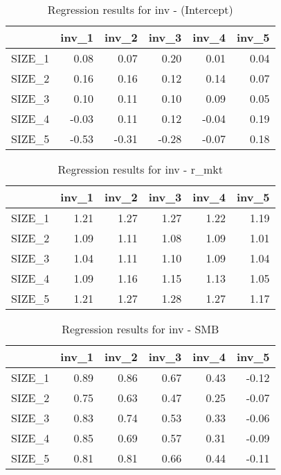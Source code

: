 \begin{table}[ht]
\centering
\caption{Regression results for inv - (Intercept)} 
\begin{tabular}{rrrrrr}
  \hline
 & inv\_1 & inv\_2 & inv\_3 & inv\_4 & inv\_5 \\ 
  \hline
SIZE\_1 & 0.08 & 0.07 & 0.20 & 0.01 & 0.04 \\ 
  SIZE\_2 & 0.16 & 0.16 & 0.12 & 0.14 & 0.07 \\ 
  SIZE\_3 & 0.10 & 0.11 & 0.10 & 0.09 & 0.05 \\ 
  SIZE\_4 & -0.03 & 0.11 & 0.12 & -0.04 & 0.19 \\ 
  SIZE\_5 & -0.53 & -0.31 & -0.28 & -0.07 & 0.18 \\ 
   \hline
\end{tabular}
\end{table}


\begin{table}[ht]
\centering
\caption{Regression results for inv - r_mkt} 
\begin{tabular}{rrrrrr}
  \hline
 & inv\_1 & inv\_2 & inv\_3 & inv\_4 & inv\_5 \\ 
  \hline
SIZE\_1 & 1.21 & 1.27 & 1.27 & 1.22 & 1.19 \\ 
  SIZE\_2 & 1.09 & 1.11 & 1.08 & 1.09 & 1.01 \\ 
  SIZE\_3 & 1.04 & 1.11 & 1.10 & 1.09 & 1.04 \\ 
  SIZE\_4 & 1.09 & 1.16 & 1.15 & 1.13 & 1.05 \\ 
  SIZE\_5 & 1.21 & 1.27 & 1.28 & 1.27 & 1.17 \\ 
   \hline
\end{tabular}
\end{table}


\begin{table}[ht]
\centering
\caption{Regression results for inv - SMB} 
\begin{tabular}{rrrrrr}
  \hline
 & inv\_1 & inv\_2 & inv\_3 & inv\_4 & inv\_5 \\ 
  \hline
SIZE\_1 & 0.89 & 0.86 & 0.67 & 0.43 & -0.12 \\ 
  SIZE\_2 & 0.75 & 0.63 & 0.47 & 0.25 & -0.07 \\ 
  SIZE\_3 & 0.83 & 0.74 & 0.53 & 0.33 & -0.06 \\ 
  SIZE\_4 & 0.85 & 0.69 & 0.57 & 0.31 & -0.09 \\ 
  SIZE\_5 & 0.81 & 0.81 & 0.66 & 0.44 & -0.11 \\ 
   \hline
\end{tabular}
\end{table}


